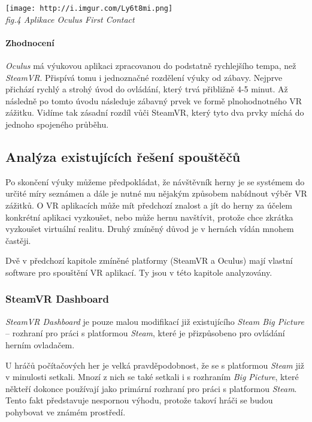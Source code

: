 \texttt{[image: http://i.imgur.com/Ly6t8mi.png]}\\
\emph{fig.4 Aplikace Oculus First Contact}

\paragraph{Zhodnocení}\label{zhodnocenuxed-1}

\emph{Oculus} má výukovou aplikaci zpracovanou do podstatně rychlejšího
tempa, než \emph{SteamVR}. Přispívá tomu i jednoznačné rozdělení výuky
od zábavy. Nejprve přichází rychlý a strohý úvod do ovládání, který trvá
přibližně 4-5 minut. Až následně po tomto úvodu následuje zábavný prvek
ve formě plnohodnotného VR zážitku. Vidíme tak zásadní rozdíl vůči
SteamVR, který tyto dva prvky míchá do jednoho spojeného průběhu.

\subsection{Analýza existujících řešení
spouštěčů}\label{analuxfdza-existujuxedcuxedch-ux159eux161enuxed-spouux161tux11bux10dux16f}

Po skončení výuky můžeme předpokládat, že návštěvník herny je se
systémem do určité míry seznámen a dále je nutné mu nějakým způsobem
nabídnout výběr VR zážitků. O VR aplikacích může mít předchozí znalost a
jít do herny za účelem konkrétní aplikaci vyzkoušet, nebo může hernu
navštívit, protože chce zkrátka vyzkoušet virtuální realitu. Druhý
zmíněný důvod je v hernách vídán mnohem častěji.

Dvě v předchozí kapitole zmíněné platformy (SteamVR a Oculus) mají
vlastní software pro spouštění VR aplikací. Ty jsou v této kapitole
analyzovány.

\subsubsection{SteamVR Dashboard}\label{steamvr-dashboard}

\emph{SteamVR Dashboard} je pouze malou modifikací již existujícího
\emph{Steam Big Picture} -- rozhraní pro práci s platformou
\emph{Steam}, které je přizpůsobeno pro ovládání herním ovladačem.

U hráčů počítačových her je velká pravděpodobnost, že se s platformou
\emph{Steam} již v minulosti setkali. Mnozí z nich se také setkali i s
rozhraním \emph{Big Picture}, které někteří dokonce používají jako
primární rozhraní pro práci s platformou \emph{Steam}. Tento fakt
představuje nespornou výhodu, protože takoví hráči se budou pohybovat ve
známém prostředí.

